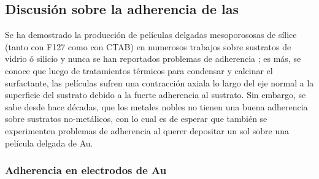 	\subsection{Discusión sobre la adherencia de las \pdm}	

		Se ha demostrado la producción de películas delgadas mesoporososas de sílice (tanto con F127 como con CTAB) en numerosos trabajos sobre sustratos de vidrio ó silicio y nunca se han reportados problemas de adherencia \cite{Angelome2008,Fuertes2010,Violi2015}; es más, se conoce que luego de tratamientos térmicos para condensar y calcinar el surfactante, las películas sufren una contracción axiala lo largo del eje normal a la superficie del sustrato debido a la fuerte adherencia al sustrato.\cite{Soler-Illia2012,Martinez2009} Sin embargo, se sabe desde hace décadas, que los metales nobles no tienen una buena adherencia sobre sustratos no-metálicos\cite{Kern1990,Hieber1976}, con lo cual es de esperar que también se experimenten problemas de adherencia al querer depositar un sol sobre una película delgada de Au. 

		\subsubsection{Adherencia en electrodos de Au}

